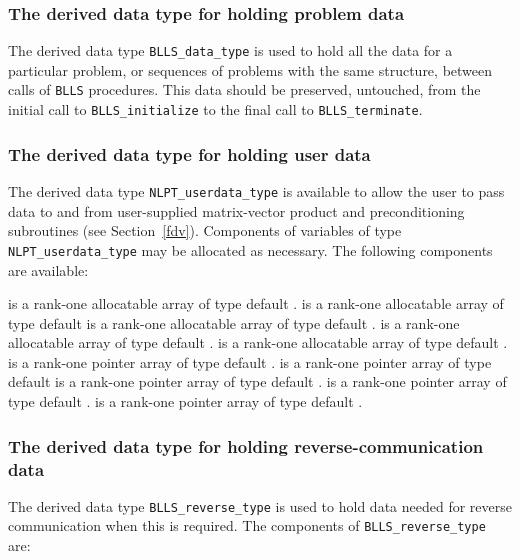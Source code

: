 \documentclass{galahad}
\newcommand{\packagename}{BLLS}
\begin{document}

\subsubsection{The derived data type for holding problem data}\label{typedata}
The derived data type
{\tt \packagename\_data\_type}
is used to hold all the data for a particular problem,
or sequences of problems with the same structure, between calls of
{\tt \packagename} procedures.
This data should be preserved, untouched, from the initial call to
{\tt \packagename\_initialize}
to the final call to
{\tt \packagename\_terminate}.


\subsubsection{The derived data type for holding user data}\label{typeuserdata}
The derived data type
{\tt NLPT\_userdata\_type}
is available to allow the user to pass data to and from user-supplied
matrix-vector product and preconditioning
subroutines (see Section~\ref{fdv}).
Components of variables of type {\tt NLPT\_userdata\-\_type} may be allocated as
necessary. The following components are available:

\begin{description}
 is a rank-one allocatable array of type default \integer.
 is a rank-one allocatable array of type default  \realdp
{} is a rank-one allocatable array of type default \complexdp.
 is a rank-one allocatable array of type default \character.
 is a rank-one allocatable array of type default \logical.
 is a rank-one pointer array of type default \integer.
 is a rank-one pointer array of type default  \realdp
{} is a rank-one pointer array of type default \complexdp.
 is a rank-one pointer array of type default \character.
 is a rank-one pointer array of type default \logical.
\end{description}


\subsubsection{The derived data type for holding reverse-communication data}\label{typereverse}
The derived data type
{\tt \packagename\_reverse\_type}
is used to hold data needed for reverse communication when this is
required.
The components of
{\tt \packagename\_reverse\_type}
are:
\end{document}
